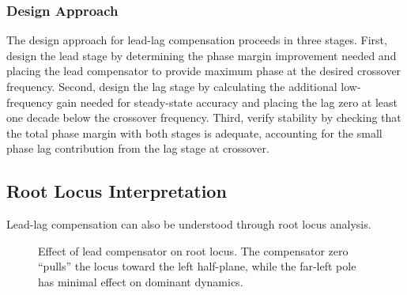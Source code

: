 \subsubsection{Design Approach}

The design approach for lead-lag compensation proceeds in three stages. First, design the lead stage by determining the phase margin improvement needed and placing the lead compensator to provide maximum phase at the desired crossover frequency. Second, design the lag stage by calculating the additional low-frequency gain needed for steady-state accuracy and placing the lag zero at least one decade below the crossover frequency. Third, verify stability by checking that the total phase margin with both stages is adequate, accounting for the small phase lag contribution from the lag stage at crossover.

\subsection{Root Locus Interpretation}

Lead-lag compensation can also be understood through root locus analysis.

\begin{figure}[htbp]
\centering
{}
\caption{Effect of lead compensator on root locus. The compensator zero ``pulls'' the locus toward the left half-plane, while the far-left pole has minimal effect on dominant dynamics.}
\label{fig:lead_root_locus}
\end{figure}

